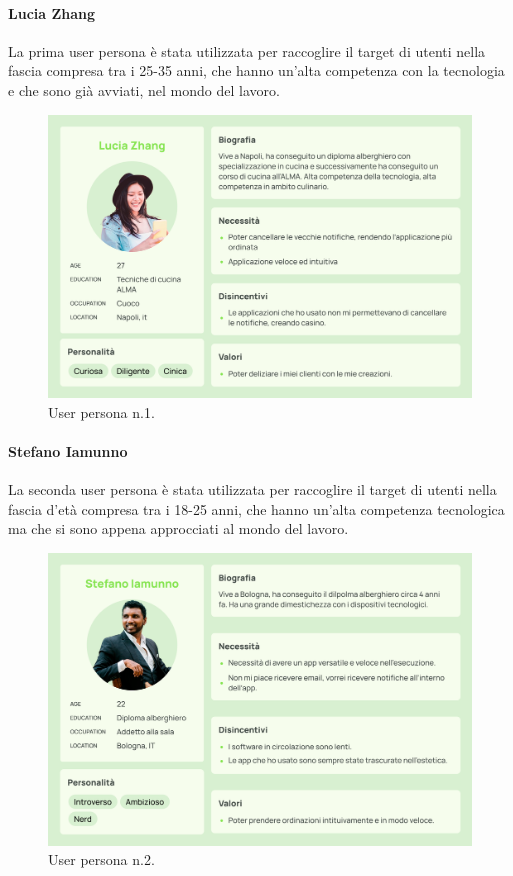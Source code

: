 \paragraph{Lucia Zhang}
La prima user persona è stata utilizzata per raccoglire il target di utenti nella fascia compresa tra i 25-35 anni, che hanno un'alta competenza con la tecnologia e che sono già avviati, nel mondo del lavoro.
\renewcommand{\figurename}{}
  \renewcommand{\thefigure}{Fig.\arabic{figure}}
\begin{figure}[H]
  \centering
  \includegraphics[scale=0.25]{img/personas/Lucia_zhang_persona.png}
  \caption{User persona n.1.}
\end{figure} 

\newpage
\paragraph{Stefano Iamunno}
La seconda user persona è stata utilizzata per raccoglire il target di utenti nella fascia d'età compresa tra i 18-25 anni, che hanno un'alta competenza tecnologica ma che si sono appena approcciati al mondo del lavoro.
\begin{figure}[H]
  \centering
  \includegraphics[scale=0.25]{img/personas/Stefano_iamunno_persona.png}
  \caption{User persona n.2.}
\end{figure} 
\newpage
